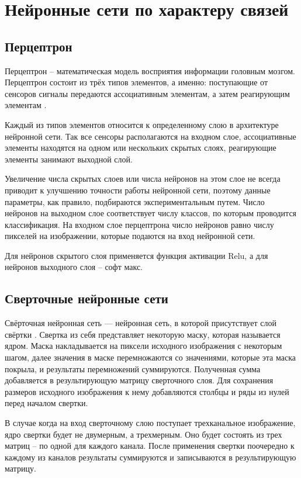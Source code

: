 \section{Нейронные сети по характеру связей}

\subsection{Перцептрон}
Перцептрон – математическая модель восприятия информации головным мозгом. Перцептрон состоит из трёх типов элементов, а именно: поступающие от сенсоров сигналы передаются ассоциативным элементам, а затем реагирующим элементам \cite{perceptron}.

Каждый из типов элементов относится к определенному слою в архитектуре нейронной сети. Так все сенсоры располагаются на входном слое, ассоциативные элементы находятся на одном или нескольких скрытых слоях, реагирующие элементы занимают выходной слой.

Увеличение числа скрытых слоев или числа нейронов на этом слое не всегда приводит к улучшению точности работы нейронной сети, поэтому данные параметры, как правило, подбираются экспериментальным путем. Число нейронов на выходном слое соответствует числу классов, по которым проводится классификация. На входном слое перцептрона число нейронов равно числу пикселей на изображении, которые подаются на вход нейронной сети.

Для нейронов скрытого слоя применяется функция активации Relu, а для нейронов выходного слоя -- софт макс.

\subsection{Сверточные нейронные сети}
Свёрточная нейронная сеть — нейронная сеть, в которой присутствует слой свёртки \cite{svertka}. Свертка из себя представляет некоторую маску, которая называется ядром. Маска накладывается на пиксели исходного изображения с некоторым шагом, далее значения в маске перемножаются со значениями, которые эта маска покрыла, и результаты перемножений суммируются. Полученная сумма добавляется в результирующую матрицу сверточного слоя. Для сохранения размеров исходного изображения к нему добавляются столбцы и ряды из нулей перед началом свертки.

В случае когда на вход сверточному слою поступает трехканальное изображение, ядро свертки будет не двумерным, а трехмерным. Оно будет состоять из трех матриц -- по одной для каждого канала. После применения свертки поочередно к каждому из каналов результаты суммируются и записываются в результирующую матрицу.

